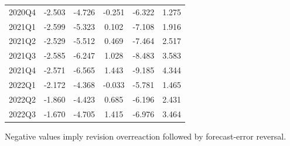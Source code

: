 \begin{table}[!htbp]
\begin{threeparttable}
\begin{tabular}{lccccc}
2020Q4 & -2.503 & -4.726 & -0.251 & -6.322 & 1.275 \\
2021Q1 & -2.599 & -5.323 & 0.102 & -7.108 & 1.916 \\
2021Q2 & -2.529 & -5.512 & 0.469 & -7.464 & 2.517 \\
2021Q3 & -2.585 & -6.247 & 1.028 & -8.483 & 3.583 \\
2021Q4 & -2.571 & -6.565 & 1.443 & -9.185 & 4.344 \\
2022Q1 & -2.172 & -4.368 & -0.033 & -5.781 & 1.465 \\
2022Q2 & -1.860 & -4.423 & 0.685 & -6.196 & 2.431 \\
2022Q3 & -1.670 & -4.705 & 1.415 & -6.976 & 3.464 \\
\bottomrule
\end{tabular}
\begin{tablenotes}[flushleft]
\footnotesize
\item Negative values imply revision overreaction followed by forecast-error reversal.
\end{tablenotes}
\end{threeparttable}
\end{table}
